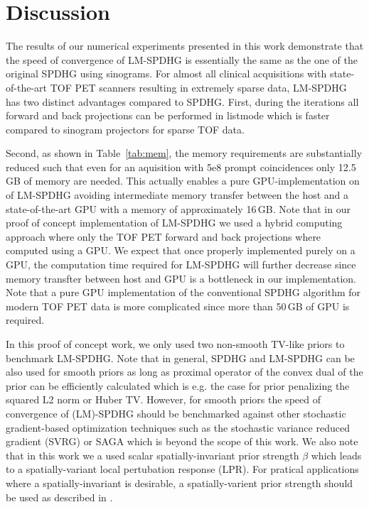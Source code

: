 
\section{Discussion}

The results of our numerical experiments presented in this work demonstrate that the speed of 
convergence of LM-SPDHG is essentially the same as the one of the original SPDHG using
sinograms.
For almost all clinical acquisitions with state-of-the-art TOF PET scanners resulting in extremely
sparse data, LM-SPDHG has two distinct advantages compared to SPDHG.
First, during the iterations all forward and back projections can be performed in listmode
which is faster compared to sinogram projectors for sparse TOF data.

Second, as shown in Table~\ref{tab:mem}, the memory requirements are substantially reduced such
that even for an aquisition with 5e8 prompt coincidences only 12.5\,GB of memory are needed.
This actually enables a pure GPU-implementation on of LM-SPDHG avoiding intermediate memory
transfer between the host and a state-of-the-art GPU with a memory of approximately 16\,GB.
Note that in our proof of concept implementation of LM-SPDHG we used a hybrid computing
approach where only the TOF PET forward and back projections where computed using a GPU.
We expect that once properly implemented purely on a GPU, the computation time required
for LM-SPDHG will further decrease since memory transfter between host and GPU is a bottleneck 
in our implementation.
Note that a pure GPU implementation of the conventional SPDHG algorithm for modern TOF PET
data is more complicated since more than 50\,GB of GPU is required.

In this proof of concept work, we only used two non-smooth TV-like priors
to benchmark LM-SPDHG. 
Note that in general, SPDHG and LM-SPDHG can be also used for smooth priors as long
as proximal operator of the convex dual of the prior can be efficiently calculated which is
e.g. the case for prior penalizing the squared L2 norm or Huber TV.
However, for smooth priors the speed of convergence of (LM)-SPDHG should be benchmarked against
other stochastic gradient-based optimization techniques such as the stochastic variance reduced gradient (SVRG) \cite{Johnson2013} or SAGA \cite{Defazio2014} which is beyond the scope of this work.
We also note that in this work we a used scalar spatially-invariant prior strength $\beta$ which
leads to a spatially-variant local pertubation response (LPR). 
For pratical applications where a spatially-invariant is desirable, a spatially-varient prior 
strength should be used as described in \cite{Ahn2008,Tsai2020}.

